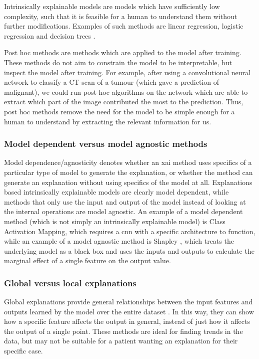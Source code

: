 \documentclass[UKenglish]{uiomasterthesis} %
\theoremstyle{definition}
\begin{document}
Intrinsically explainable models are models which have sufficiently low complexity, such that it is feasible for a human to understand them without further modifications. Examples of such methods are linear regression, logistic regression and decision trees \cite{molnar}. 

Post hoc methods are methods which are applied to the model after training. These methods do not aim to constrain the model to be interpretable, but inspect the model after training. For example, after using a convolutional neural network to classify a CT-scan of a tumour (which gave a prediction of malignant), we could run post hoc algorithms on the network which are able to extract which part of the image contributed the most to the prediction. Thus, post hoc methods remove the need for the model to be simple enough for a human to understand by extracting the relevant information for us.

\subsubsection{Model dependent versus model agnostic methods}

Model dependence/agnosticity denotes whether an \ac{xai} method uses specifics of a particular type of model to generate the explanation, or whether the method can generate an explanation without using specifics of the model at all. Explanations based intrinsically explainable models are clearly model dependent, while methods that only use the input and output of the model instead of looking at the internal operations are model agnostic. An example of a model dependent method (which is not simply an intrinsically explainable model) is Class Activation Mapping, which requires a \ac{cnn} with a specific architecture to function, while an example of a model agnostic method is Shapley \cite{shapley}, which treats the underlying model as a black box and uses the inputs and outputs to calculate the marginal effect of a single feature on the output value.

\subsubsection{Global versus local explanations}

Global explanations provide general relationships between the input features and outputs learned by the model over the entire dataset \cite{xaioverview}. In this way, they can show how a specific feature affects the output in general, instead of just how it affects the output of a single point. These methods are ideal for finding trends in the data, but may not be suitable for a patient wanting an explanation for their specific case.
\end{document}
